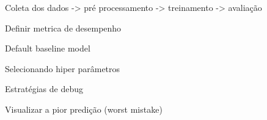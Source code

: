 Coleta dos dados -> pré processamento -> treinamento -> avaliação 



Definir metrica de desempenho

Default baseline model

Selecionando hiper parâmetros

Estratégias de debug

Visualizar a pior predição (worst mistake)
















